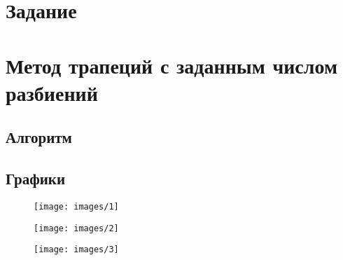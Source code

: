\documentclass[a4paper, 14pt]{article}
\begin{document}



\setcounter{page}{2}

\section*{Задание}


\section{Метод трапеций с заданным числом разбиений}

\subsection{Алгоритм}



\subsection{Графики}

\begin{figure}[H]
    \centering
    \caption{}
    \texttt{[image: images/1]}
    \label{fig:1}
\end{figure}
\begin{figure}[H]
    \centering
    \caption{}
    \texttt{[image: images/2]}
    \label{fig:2}
\end{figure}
\begin{figure}[H]
    \centering
    \caption{}
    \texttt{[image: images/3]}
    \label{fig:3}
\end{figure}
\end{document}
